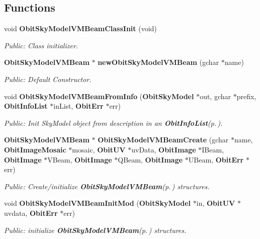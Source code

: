 \subsection*{Functions}
\begin{CompactItemize}
\item 
void {\bf Obit\-Sky\-Model\-VMBeam\-Class\-Init} (void)
\begin{CompactList}\small\item\em Public: Class initializer. \item\end{CompactList}\item 
{\bf Obit\-Sky\-Model\-VMBeam} $\ast$ {\bf new\-Obit\-Sky\-Model\-VMBeam} (gchar $\ast$name)
\begin{CompactList}\small\item\em Public: Default Constructor. \item\end{CompactList}\item 
void {\bf Obit\-Sky\-Model\-VMBeam\-From\-Info} ({\bf Obit\-Sky\-Model} $\ast$out, gchar $\ast$prefix, {\bf Obit\-Info\-List} $\ast$in\-List, {\bf Obit\-Err} $\ast$err)
\begin{CompactList}\small\item\em Public: Init Sky\-Model object from description in an {\bf Obit\-Info\-List}{\rm (p.\,\pageref{structObitInfoList})}. \item\end{CompactList}\item 
{\bf Obit\-Sky\-Model\-VMBeam} $\ast$ {\bf Obit\-Sky\-Model\-VMBeam\-Create} (gchar $\ast$name, {\bf Obit\-Image\-Mosaic} $\ast$mosaic, {\bf Obit\-UV} $\ast$uv\-Data, {\bf Obit\-Image} $\ast$IBeam, {\bf Obit\-Image} $\ast$VBeam, {\bf Obit\-Image} $\ast$QBeam, {\bf Obit\-Image} $\ast$UBeam, {\bf Obit\-Err} $\ast$err)
\begin{CompactList}\small\item\em Public: Create/initialize {\bf Obit\-Sky\-Model\-VMBeam}{\rm (p.\,\pageref{structObitSkyModelVMBeam})} structures. \item\end{CompactList}\item 
void {\bf Obit\-Sky\-Model\-VMBeam\-Init\-Mod} ({\bf Obit\-Sky\-Model} $\ast$in, {\bf Obit\-UV} $\ast$uvdata, {\bf Obit\-Err} $\ast$err)
\begin{CompactList}\small\item\em Public: initialize {\bf Obit\-Sky\-Model\-VMBeam}{\rm (p.\,\pageref{structObitSkyModelVMBeam})} structures. \item\end{CompactList}\item 

\end{CompactItemize}
